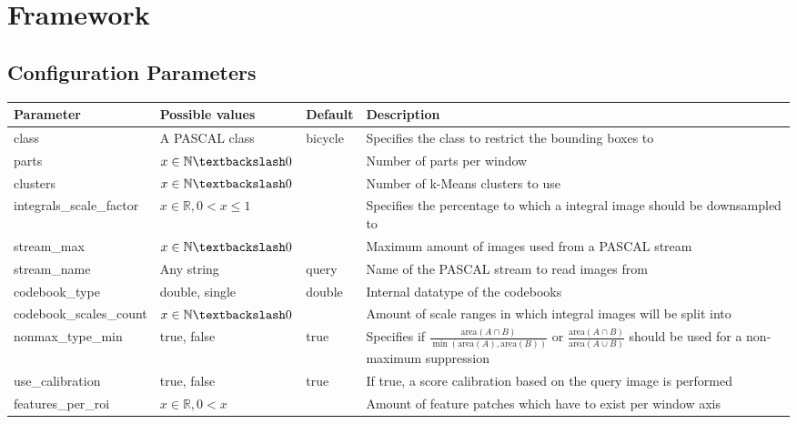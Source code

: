 \chapter{Framework}
\section{Configuration Parameters}
\begin{longtable}{%
|%
p{}%
|%
>{\raggedright\arraybackslash}%
p{}%
|%
>{\raggedright\arraybackslash}%
p{}%
|%
>{\raggedright\arraybackslash}%
p{}%
|%
}
\hline \textbf{Parameter} & \textbf{Possible values} & \textbf{Default} & \textbf{Description} \\ 
\hline
\hline class & A PASCAL class & bicycle & Specifies the class to restrict the bounding boxes to \\ 
\hline parts & $x \in \mathbb{N} \textbackslash 0$ & 4 & Number of parts per window \\ 
\hline clusters & $x \in \mathbb{N} \textbackslash 0$ & 1000 & Number of k-Means clusters to use \\ 
\hline integrals\allowbreak\_scale\allowbreak\_factor & $x \in \mathbb{R}, 0 < x \le 1$ & 1 & Specifies the percentage to which a integral image should be downsampled to \\ 
\hline stream\allowbreak\_max & $x \in \mathbb{N} \textbackslash 0$ & 100 & Maximum amount of images used from a PASCAL stream \\ 
\hline stream\allowbreak\_name & Any string & query & Name of the PASCAL stream to read images from \\ 
\hline codebook\allowbreak\_type & double, single & double & Internal datatype of the codebooks \\ 
\hline codebook\allowbreak\_scales\allowbreak\_count & $x \in \mathbb{N} \textbackslash 0$ & 3 & Amount of scale ranges in which integral images will be split into \\ 
\hline nonmax\allowbreak\_type\allowbreak\_min & true, false & true & Specifies if $\frac{\text{area}(A \cap B)}{\min(\text{area}(A), \text{area}(B))}$ or $\frac{\text{area}(A \cap B)}{\text{area}(A \cup B)}$ should be used for a non-maximum suppression \\ 
\hline use\allowbreak\_calibration & true, false & true & If true, a score calibration based on the query image is performed \\ 
\hline features\allowbreak\_per\allowbreak\_roi & $x \in \mathbb{R}, 0 < x$ & 2 & Amount of feature patches which have to exist per window axis \\ 

\end{longtable}
